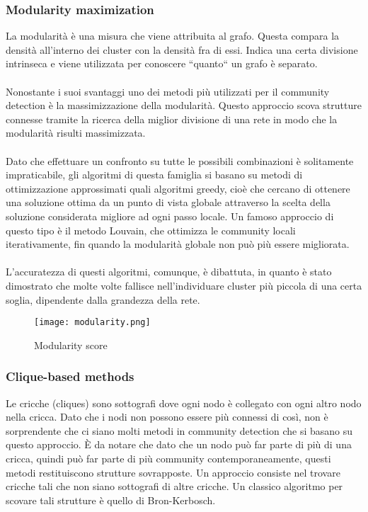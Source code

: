 \subsubsection{Modularity maximization}
La modularità è una misura che viene attribuita al grafo.  Questa compara la densità all’interno dei cluster con la densità fra di essi. Indica una certa divisione intrinseca e viene utilizzata per conoscere “quanto“ un grafo è separato.
\\\\
Nonostante i suoi svantaggi uno dei metodi più utilizzati per il community detection è la massimizzazione della modularità. Questo approccio scova strutture connesse tramite la ricerca della miglior divisione di una rete in modo che la modularità risulti massimizzata. 
\\\\
Dato che effettuare un confronto su tutte le possibili combinazioni è solitamente impraticabile, gli algoritmi di questa famiglia si basano su metodi di ottimizzazione approssimati quali algoritmi greedy, cioè che cercano di ottenere una soluzione ottima da un punto di vista globale attraverso la scelta della soluzione considerata migliore ad ogni passo locale. Un famoso approccio di questo tipo è il metodo Louvain, che ottimizza le community locali iterativamente, fin quando la modularità globale non può più essere migliorata. 
\\\\
L’accuratezza di questi algoritmi, comunque, è dibattuta, in quanto è stato dimostrato che molte volte fallisce nell’individuare cluster più piccola di una certa soglia, dipendente dalla grandezza della rete. 
\begin{figure}[htb]
	\centering
	\texttt{[image: modularity.png]}
	\caption{Modularity score}
	\label{modularity}
\end{figure}
\subsubsection{Clique-based methods}
Le cricche (cliques) sono sottografi dove ogni nodo è collegato con ogni altro nodo nella cricca. Dato che i nodi non possono essere più connessi di così, non è sorprendente che ci siano molti metodi in community detection che si basano su questo approccio. È da notare che dato che un nodo può far parte di più di una cricca, quindi può far parte di più community contemporaneamente, questi metodi restituiscono strutture sovrapposte. 
Un approccio consiste nel trovare cricche tali che non siano sottografi di altre cricche. Un classico algoritmo per scovare tali strutture è quello di Bron-Kerbosch.




